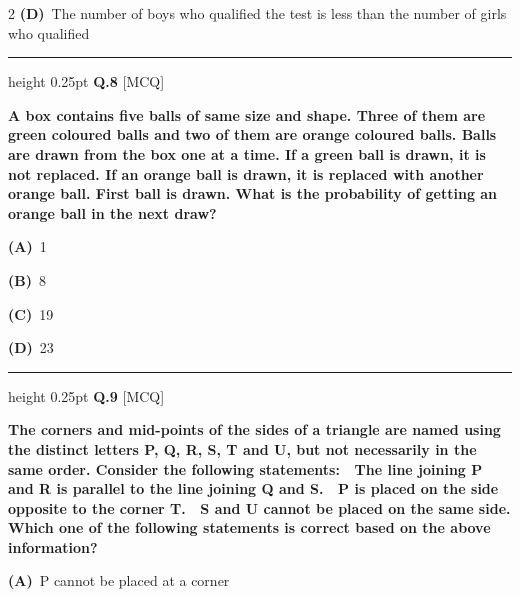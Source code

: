 \documentclass[a4paper,10pt,twoside]{article}
\begin{document}
\begin{multicols}{2}
\textbf{(D)}~The number of boys who qualified the test is less than the number of girls who \newline qualified
\par\vspace{6pt}\hrule height 0.25pt\vspace{6pt}
\noindent\textbf{Q.8} \hfill {\footnotesize\textsf{[MCQ]}}
\par\vspace{2pt}
{\bfseries A box contains five balls of same size and shape. Three of them are green
coloured balls and two of them are orange coloured balls. Balls are drawn from
the box one at a time. If a green ball is drawn, it is not replaced. If an orange ball
is drawn, it is replaced with another orange ball.
First ball is drawn. What is the probability of getting an orange ball in the next
draw? \par}
\par\vspace{2pt}\noindent
\textbf{(A)}~1 \par\vspace{2pt}\noindent
\textbf{(B)}~8 \par\vspace{2pt}\noindent
\textbf{(C)}~19 \par\vspace{2pt}\noindent
\textbf{(D)}~23 
\par\vspace{6pt}\hrule height 0.25pt\vspace{6pt}
\noindent\textbf{Q.9} \hfill {\footnotesize\textsf{[MCQ]}}
\par\vspace{2pt}
{\bfseries The corners and mid-points of the sides of a triangle are named using the distinct
letters P, Q, R, S, T and U, but not necessarily in the same order. Consider the
following statements:
 The line joining P and R is parallel to the line joining Q and S.
 P is placed on the side opposite to the corner T.
 S and U cannot be placed on the same side.
Which one of the following statements is correct based on the above
information? \par}
\par\vspace{2pt}\noindent
\textbf{(A)}~P cannot be placed at a corner\par\vspace{2pt}\noindent

\end{multicols}
\end{document}
